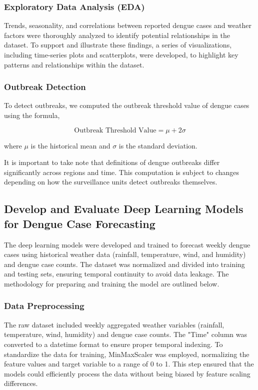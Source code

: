 \subsubsection{Exploratory Data Analysis (EDA)}
Trends, seasonality, and correlations between reported dengue cases and weather factors were thoroughly analyzed to identify potential relationships in the dataset. To support and illustrate these findings, a series of visualizations, including time-series plots and scatterplots, were developed, to highlight key patterns and relationships within the dataset. 

\subsubsection{Outbreak Detection}
To detect outbreaks, we computed the outbreak threshold value of dengue cases using the formula, 

\begin{equation}
	\text{Outbreak Threshold Value} = \mu + 2\sigma
\end{equation}

where \(\mu\) is the historical mean and \(\sigma \) is the standard deviation.

It is important to take note that definitions of dengue outbreaks differ significantly across regions and time. This computation is subject to changes depending on how the surveillance units detect outbreaks themselves.

\subsection{Develop and Evaluate Deep Learning Models for Dengue Case Forecasting}
The deep learning models were developed and trained to forecast weekly dengue cases using historical weather data (rainfall, temperature, wind, and humidity) and dengue case counts. The dataset was normalized and divided into training and testing sets, ensuring temporal continuity to avoid data leakage. The methodology for preparing and training the model are outlined below.

\subsubsection{Data Preprocessing}
The raw dataset included weekly aggregated weather variables (rainfall, temperature, wind, humidity) and dengue case counts. The "Time" column was converted to a datetime format to ensure proper temporal indexing. To standardize the data for training, MinMaxScaler was employed, normalizing the feature values and target variable to a range of 0 to 1. This step ensured that the models could efficiently process the data without being biased by feature scaling differences.

